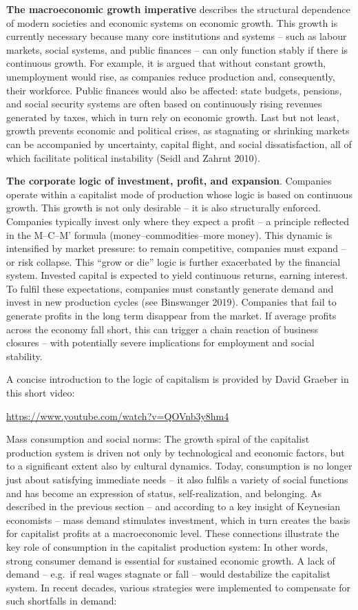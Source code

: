 \documentclass[
  a4paper,
  openany]{book}
\begin{document}
\textbf{The macroeconomic growth imperative} describes the structural
dependence of modern societies and economic systems on economic growth.
This growth is currently necessary because many core institutions and
systems -- such as labour markets, social systems, and public finances
-- can only function stably if there is continuous growth. For example,
it is argued that without constant growth, unemployment would rise, as
companies reduce production and, consequently, their workforce. Public
finances would also be affected: state budgets, pensions, and social
security systems are often based on continuously rising revenues
generated by taxes, which in turn rely on economic growth. Last but not
least, growth prevents economic and political crises, as stagnating or
shrinking markets can be accompanied by uncertainty, capital flight, and
social dissatisfaction, all of which facilitate political instability
(Seidl and Zahrnt 2010).

\textbf{The corporate logic of investment, profit, and expansion}.
Companies operate within a capitalist mode of production whose logic is
based on continuous growth. This growth is not only desirable -- it is
also structurally enforced. Companies typically invest only where they
expect a profit -- a principle reflected in the M--C--M' formula
(money--commodities--more money). This dynamic is intensified by market
pressure: to remain competitive, companies must expand -- or risk
collapse. This ``grow or die'' logic is further exacerbated by the
financial system. Invested capital is expected to yield continuous
returns, earning interest. To fulfil these expectations, companies must
constantly generate demand and invest in new production cycles (see
Binswanger 2019). Companies that fail to generate profits in the long
term disappear from the market. If average profits across the economy
fall short, this can trigger a chain reaction of business closures --
with potentially severe implications for employment and social
stability.

A concise introduction to the logic of capitalism is provided by David
Graeber in this short video:

\url{https://www.youtube.com/watch?v=QOVnb3y8hm4}

Mass consumption and social norms: The growth spiral of the capitalist
production system is driven not only by technological and economic
factors, but to a significant extent also by cultural dynamics. Today,
consumption is no longer just about satisfying immediate needs -- it
also fulfils a variety of social functions and has become an expression
of status, self-realization, and belonging. As described in the previous
section -- and according to a key insight of Keynesian economists --
mass demand stimulates investment, which in turn creates the basis for
capitalist profits at a macroeconomic level. These connections
illustrate the key role of consumption in the capitalist production
system: In other words, strong consumer demand is essential for
sustained economic growth. A lack of demand -- e.g.~if real wages
stagnate or fall -- would destabilize the capitalist system. In recent
decades, various strategies were implemented to compensate for such
shortfalls in demand:
\end{document}
